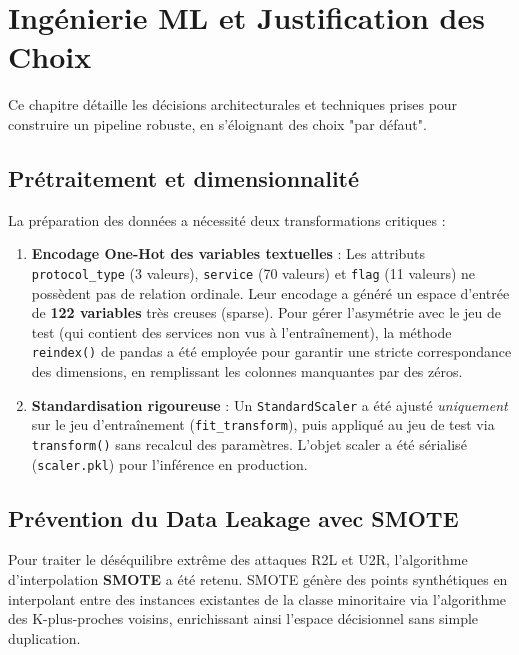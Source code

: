 \documentclass[12pt,a4paper]{report}
\begin{document}
\chapter{Ingénierie ML et Justification des Choix}

Ce chapitre détaille les décisions architecturales et techniques prises pour construire un pipeline robuste, en s'éloignant des choix "par défaut".

\section{Prétraitement et dimensionnalité}

La préparation des données a nécessité deux transformations critiques :
\begin{enumerate}
    \item \textbf{Encodage One-Hot des variables textuelles} : Les attributs \texttt{protocol\_type} (3 valeurs), \texttt{service} (70 valeurs) et \texttt{flag} (11 valeurs) ne possèdent pas de relation ordinale. Leur encodage a généré un espace d'entrée de \textbf{122 variables} très creuses (sparse). Pour gérer l'asymétrie avec le jeu de test (qui contient des services non vus à l'entraînement), la méthode \texttt{reindex()} de pandas a été employée pour garantir une stricte correspondance des dimensions, en remplissant les colonnes manquantes par des zéros.
    \item \textbf{Standardisation rigoureuse} : Un \texttt{StandardScaler} a été ajusté \textit{uniquement} sur le jeu d'entraînement (\texttt{fit\_transform}), puis appliqué au jeu de test via \texttt{transform()} sans recalcul des paramètres. L'objet scaler a été sérialisé (\texttt{scaler.pkl}) pour l'inférence en production.
\end{enumerate}

\section{Prévention du Data Leakage avec SMOTE}

Pour traiter le déséquilibre extrême des attaques R2L et U2R, l'algorithme d'interpolation \textbf{SMOTE} \cite{chawla2002} a été retenu. SMOTE génère des points synthétiques en interpolant entre des instances existantes de la classe minoritaire via l'algorithme des K-plus-proches voisins, enrichissant ainsi l'espace décisionnel sans simple duplication.
\end{document}
